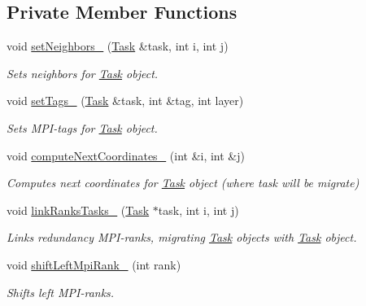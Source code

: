 \subsection*{Private Member Functions}
\begin{DoxyCompactItemize}
\item 
void \hyperlink{classGrid_a034883cab93fa5151698e701bc6e0c9a}{set\+Neighbors\+\_\+} (\hyperlink{classTask}{Task} \&task, int i, int j)
\begin{DoxyCompactList}\small\item\em Sets neighbors for \hyperlink{classTask}{Task} object. \end{DoxyCompactList}\item 
void \hyperlink{classGrid_a79c78c433b81b2e244638e241ee641c2}{set\+Tags\+\_\+} (\hyperlink{classTask}{Task} \&task, int \&tag, int layer)
\begin{DoxyCompactList}\small\item\em Sets M\+P\+I-\/tags for \hyperlink{classTask}{Task} object. \end{DoxyCompactList}\item 
void \hyperlink{classGrid_acfe963747261970f0780d45c061d5919}{compute\+Next\+Coordinates\+\_\+} (int \&i, int \&j)
\begin{DoxyCompactList}\small\item\em Computes next coordinates for \hyperlink{classTask}{Task} object (where task will be migrate) \end{DoxyCompactList}\item 
void \hyperlink{classGrid_a35e3d8d76011228b486589fb8d24e7a1}{link\+Ranks\+Tasks\+\_\+} (\hyperlink{classTask}{Task} $\ast$task, int i, int j)
\begin{DoxyCompactList}\small\item\em Links redundancy M\+P\+I-\/ranks, migrating \hyperlink{classTask}{Task} objects with \hyperlink{classTask}{Task} object. \end{DoxyCompactList}\item 
void \hyperlink{classGrid_a301d15afb8ad3d86c8fec9d7cf02fa2b}{shift\+Left\+Mpi\+Rank\+\_\+} (int rank)
\begin{DoxyCompactList}\small\item\em Shifts left M\+P\+I-\/ranks. \end{DoxyCompactList}\end{DoxyCompactItemize}
